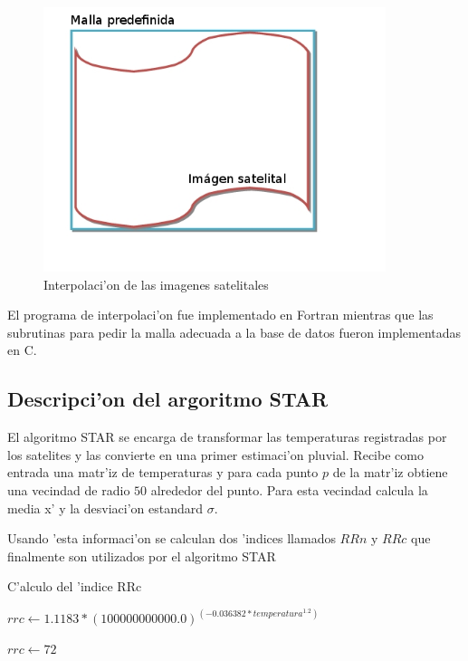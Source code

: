   \begin{figure}[h!]
  \centering
  \includegraphics[width=100mm,bb=0 0 502 388]{./imagenes/malla.jpg}
  \caption{Interpolaci'on de las imagenes satelitales}
  \end{figure}

  El programa de interpolaci'on fue implementado en Fortran mientras que las subrutinas para 
  pedir la malla adecuada a la base de datos fueron implementadas en C.

\subsection{Descripci'on del argoritmo STAR}
  El algoritmo STAR\cite{star} se encarga de transformar las temperaturas registradas por los satelites y las convierte
  en una primer estimaci'on pluvial. Recibe como entrada una matr'iz de temperaturas y para cada punto $p$ de la matr'iz
  obtiene una vecindad de radio $50$ alrededor del punto. Para esta vecindad calcula la media x' y la desviaci'on estandard $\sigma$.

  Usando 'esta informaci'on se calculan dos 'indices llamados $RRn$ y $RRc$ que finalmente son utilizados por el algoritmo STAR

  \begin{algorithm}
  \caption{C'alculo del 'indice RRc}

  \begin{algorithmic}
	  \STATE $rrc \gets 1.1183* (100000000000.0)^(-0.036382*temperatura^{1.2})$
  \ELSE
	  
	  \STATE $rrc \gets 72$ 
	  
  \ENDIF 
  \end{algorithmic}
  \end{algorithm}

